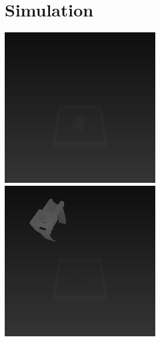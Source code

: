 \section{Simulation}\label{app:simulation}

\includegraphics[width=\linewidth]{figures/simulation/depth-grabbing}
\includegraphics[width=\linewidth]{figures/simulation/depth-in}
